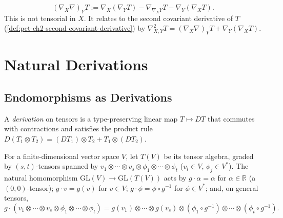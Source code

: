 \begin{definition}
  \label{def:pet-ch2-covariant-derivative-connection}
  \leanok
  \[
    (\nabla_X\nabla)_YT := \nabla_X(\nabla_YT)-\nabla_{\nabla_XY}T-\nabla_Y(\nabla_XT).
  \]
  This is not tensorial in $X$. It relates to the second covariant derivative
  of $T$ (\cref{def:pet-ch2-second-covariant-derivative}) by
  $\nabla^2_{X,Y}T=(\nabla_X\nabla)_YT+\nabla_Y(\nabla_XT)$.
\end{definition}

\section{Natural Derivations}

\subsection{Endomorphisms as Derivations}

\begin{definition}
  \label{def:pet-ch2-tensor-derivation}
  \leanok
  A \emph{derivation} on tensors is a type-preserving linear map
  $T\mapsto DT$ that commutes with contractions and satisfies the product rule
  $D(T_1\otimes T_2)=(DT_1)\otimes T_2+T_1\otimes(DT_2)$.
\end{definition}

\begin{definition}
  \label{def:pet-ch2-gl-action-tensor-algebra}
  \leanok
  For a finite-dimensional vector space $V$, let $T(V)$ be its tensor algebra,
  graded by $(s,t)$-tensors spanned by
  $v_1\otimes\cdots\otimes v_s\otimes\phi_1\otimes\cdots\otimes\phi_t$
  ($v_i\in V$, $\phi_j\in V^*$). The natural homomorphism
  $\mathrm{GL}(V)\to\mathrm{GL}(T(V))$ acts by $g\cdot\alpha=\alpha$ for
  $\alpha\in\mathbb{R}$ (a $(0,0)$-tensor); $g\cdot v=g(v)$ for $v\in V$;
  $g\cdot\phi=\phi\circ g^{-1}$ for $\phi\in V^*$; and, on general tensors,
  \[
    g\cdot(v_1\otimes\cdots\otimes v_s\otimes\phi_1\otimes\cdots\otimes\phi_t)
    = g(v_1)\otimes\cdots\otimes g(v_s)\otimes(\phi_1\circ g^{-1})\otimes\cdots\otimes(\phi_t\circ g^{-1}).
  \]
\end{definition}

